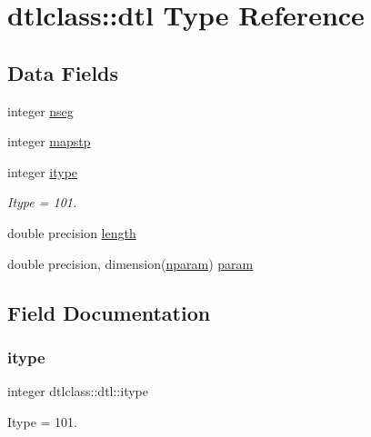 \hypertarget{structdtlclass_1_1dtl}{}\section{dtlclass\+::dtl Type Reference}
\label{structdtlclass_1_1dtl}
\subsection*{Data Fields}
\begin{DoxyCompactItemize}
\item 
integer \mbox{\hyperlink{structdtlclass_1_1dtl_ab0c5195ab0993ee3107484257b94cfe5}{nseg}}
\item 
integer \mbox{\hyperlink{structdtlclass_1_1dtl_ad89c7805074fee80c05af3ae3861cb87}{mapstp}}
\item 
integer \mbox{\hyperlink{structdtlclass_1_1dtl_a75f1d8c2908cb2ac40cd24dc45a122ff}{itype}}
\begin{DoxyCompactList}\small\item\em Itype = 101. \end{DoxyCompactList}\item 
double precision \mbox{\hyperlink{structdtlclass_1_1dtl_ac3b7a490164af376dab82d59957bcdd3}{length}}
\item 
double precision, dimension(\mbox{\hyperlink{namespacedtlclass_adf04761c96168c3dc492c89c72194cea}{nparam}}) \mbox{\hyperlink{structdtlclass_1_1dtl_a95bc1c81e12444e39d8ea61b6e67ae34}{param}}
\end{DoxyCompactItemize}


\subsection{Field Documentation}
\mbox{\label{structdtlclass_1_1dtl_a75f1d8c2908cb2ac40cd24dc45a122ff}} 
\subsubsection{\texorpdfstring{itype}{itype}}
{\footnotesize\ttfamily integer dtlclass\+::dtl\+::itype}



Itype = 101. 

\mbox{\label{structdtlclass_1_1dtl_ac3b7a490164af376dab82d59957bcdd3}} 
